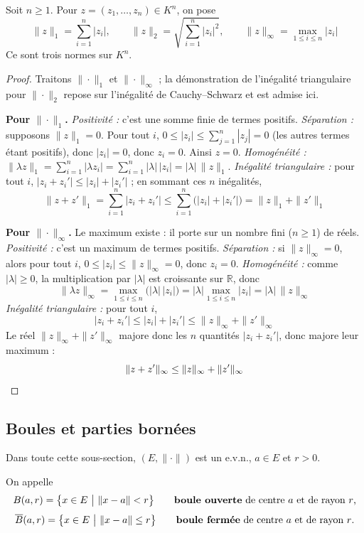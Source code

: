 \begin{exemple}
\label{ex:normes-kn}
Soit $n\geq 1$. Pour $z=(z_1,\dots,z_n)\in K^n$, on pose
\[\|z\|_1 = \sum_{i=1}^{n}|z_i|, \qquad \|z\|_2 = \sqrt{\sum_{i=1}^{n}|z_i|^2}, \qquad \|z\|_\infty = \max_{1\leq i\leq n}|z_i|\]
Ce sont trois normes sur $K^n$.
\end{exemple}

\begin{proof}
Traitons $\|\cdot\|_1$ et $\|\cdot\|_\infty$ ; la démonstration de l'inégalité triangulaire pour $\|\cdot\|_2$ repose sur l'inégalité de Cauchy--Schwarz et est admise ici.

\textbf{Pour $\|\cdot\|_1$.}
\emph{Positivité :} c'est une somme finie de termes positifs.
\emph{Séparation :} supposons $\|z\|_1=0$. Pour tout $i$, $0\leq |z_i| \leq \sum_{j=1}^{n}|z_j| = 0$ (les autres termes étant positifs), donc $|z_i|=0$, donc $z_i=0$. Ainsi $z=0$.
\emph{Homogénéité :} $\|\lambda z\|_1 = \sum_{i=1}^n |\lambda z_i| = \sum_{i=1}^n |\lambda|\,|z_i| = |\lambda|\,\|z\|_1$.
\emph{Inégalité triangulaire :} pour tout $i$, $|z_i+z_i'|\leq |z_i|+|z_i'|$ ; en sommant ces $n$ inégalités,
\[\|z+z'\|_1 = \sum_{i=1}^{n}|z_i+z_i'| \leq \sum_{i=1}^{n}\big(|z_i|+|z_i'|\big) = \|z\|_1+\|z'\|_1\]

\textbf{Pour $\|\cdot\|_\infty$.} Le maximum existe : il porte sur un nombre fini ($n\geq 1$) de réels.
\emph{Positivité :} c'est un maximum de termes positifs.
\emph{Séparation :} si $\|z\|_\infty=0$, alors pour tout $i$, $0\leq|z_i|\leq\|z\|_\infty=0$, donc $z_i=0$.
\emph{Homogénéité :} comme $|\lambda|\geq 0$, la multiplication par $|\lambda|$ est croissante sur $\mathbb{R}$, donc
\[\|\lambda z\|_\infty = \max_{1\leq i\leq n}\big(|\lambda|\,|z_i|\big) = |\lambda|\max_{1\leq i\leq n}|z_i| = |\lambda|\,\|z\|_\infty\]
\emph{Inégalité triangulaire :} pour tout $i$,
\[|z_i+z_i'| \leq |z_i|+|z_i'| \leq \|z\|_\infty + \|z'\|_\infty\]
Le réel $\|z\|_\infty+\|z'\|_\infty$ majore donc les $n$ quantités $|z_i+z_i'|$, donc majore leur maximum :
\[\|z+z'\|_\infty \leq \|z\|_\infty+\|z'\|_\infty\qedhere\]
\end{proof}

\subsection{Boules et parties bornées}

Dans toute cette sous-section, $(E,\|\cdot\|)$ est un e.v.n., $a\in E$ et $r>0$.

\begin{defi}[Boules]
\label{defi:boule}
On appelle
\[B(a,r) = \big\{x\in E \ \big|\ \|x-a\|<r\big\} \qquad\text{\textbf{boule ouverte} de centre $a$ et de rayon $r$,}\]
\[\overline{B}(a,r) = \big\{x\in E \ \big|\ \|x-a\|\leq r\big\} \qquad\text{\textbf{boule fermée} de centre $a$ et de rayon $r$.}\]
\end{defi}


